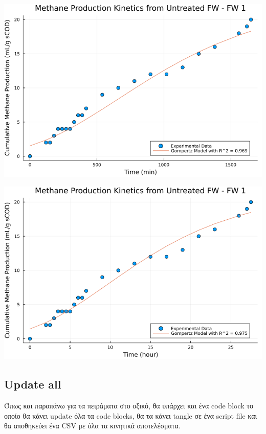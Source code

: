 \documentclass[11pt]{article}
\begin{document}
\begin{center}
\includegraphics[width=.9\linewidth]{../plots/BMPs/Untreated FW/methane_kinetics_untreated_fw_1_min.png}
\end{center}

\begin{center}
\includegraphics[width=.9\linewidth]{../plots/BMPs/Untreated FW/methane_kinetics_untreated_fw_1_hour.png}
\end{center}


\subsection{Update all}
\label{sec:orgf0760be}
Όπως και παραπάνω για τα πειράματα στο οξικό, θα υπάρχει και ένα code block το οποίο θα κάνει update όλα τα code blocks, θα τα κάνει tangle σε ένα script file και θα αποθηκεύει ένα CSV με όλα τα κινητικά αποτελέσματα.
\end{document}

